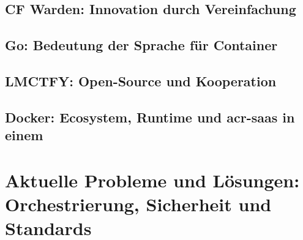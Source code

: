 \subsection{CF Warden: Innovation durch Vereinfachung}
\label{sec:geschichteCFWarden}

\subsection{Go: Bedeutung der Sprache für Container}
\label{sec:geschichteGo}

\subsection{LMCTFY: Open-Source und Kooperation}
\label{sec:geschichteLMCTFY}

\subsection{Docker: Ecosystem, Runtime und \gls{acr-saas} in einem}
\label{sec:geschichteDocker}

\section{Aktuelle Probleme und Lösungen: Orchestrierung, Sicherheit und Standards}
\label{sec:geschichteAktuell}